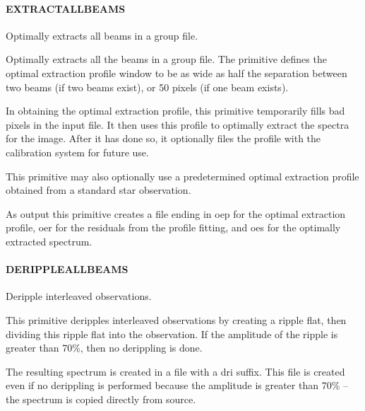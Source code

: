 \documentclass[twoside,11pt]{article}
\renewcommand{\_}{\texttt{\symbol{95}}}
\begin{document}
\paragraph{\_EXTRACT\_ALL\_BEAMS\_\label{_EXTRACT_ALL_BEAMS_}}


Optimally extracts all beams in a group file.


\mbox{}


Optimally extracts all the beams in a group file. The primitive defines
the optimal extraction profile window to be as wide as half the separation
between two beams (if two beams exist), or 50 pixels (if one beam exists).



In obtaining the optimal extraction profile, this primitive temporarily
fills bad pixels in the input file. It then uses this profile to optimally
extract the spectra for the image. After it has done so, it optionally 
files the profile with the calibration system for future use.



This primitive may also optionally use a predetermined optimal extraction
profile obtained from a standard star observation.



As output this primitive creates a file ending in \_oep for the optimal
extraction profile, \_oer for the residuals from the profile fitting, and
\_oes for the optimally extracted spectrum.

\paragraph{\_DERIPPLE\_ALL\_BEAMS\_\label{_DERIPPLE_ALL_BEAMS_}}


Deripple interleaved observations.


\mbox{}


This primitive deripples interleaved observations by creating a ripple
flat, then dividing this ripple flat into the observation. If the amplitude
of the ripple is greater than 70\%, then no derippling is done.



The resulting spectrum is created in a file with a \_dri suffix. This
file is created even if no derippling is performed because the amplitude
is greater than 70\% -- the spectrum is copied directly from source.
\end{document}
